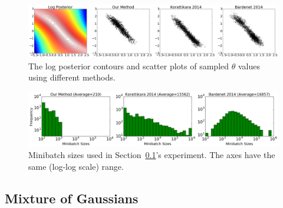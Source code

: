 \documentclass[twoside]{article} \usepackage{aistats2017}
\begin{document}
\begin{figure}[t]
    \centering
    \includegraphics[width=0.85\linewidth]{GaussianMixtureResult/posterior_of_gaussian.png}
    \caption{
    The log posterior contours and scatter plots of sampled $\theta$ values
    using different methods. 
    }
    \label{fig:gauss_mix_1}
\end{figure}
\begin{figure}[t]
    \centering
    \includegraphics[width=0.85\linewidth]{minibatch_size_gaussian.png}
    \caption{
    Minibatch sizes used in Section~\ref{ssec:gaussians}'s experiment. The axes
    have the same (log-log scale) range.
    }
    \label{fig:gauss_mix_2}
\end{figure}


\subsection{Mixture of Gaussians}\label{ssec:gaussians}

\begin{table}[t]
    \caption{Gaussian Mixture Model Statistics}
    \label{tab:poissons}
    \centering
\end{table}
\end{document}
